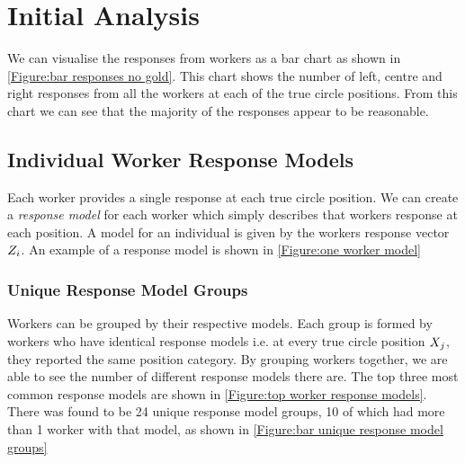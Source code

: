 \section{Initial Analysis}

We can visualise the responses from workers as a bar chart as shown in \ref{Figure:bar responses no gold}. This chart shows the number of left, centre and right responses from all the workers at each of the true circle positions. From this chart we can see that the majority of the responses appear to be reasonable.






\subsection{Individual Worker Response Models}

Each worker provides a single response at each true circle position. We can create a \textit{ response model} for each worker which simply describes that workers response at each position. A model for an individual is given by the workers response vector $Z_i$. An example of a response model is shown in \ref{Figure:one worker model}


\subsubsection{Unique Response Model Groups}
Workers can be grouped by their respective models. Each group is formed by workers who have identical response models i.e. at every true circle position $X_j$, they reported the same position category. By grouping workers together, we are able to see the number of different response models there are. The top three most common response models are shown in \ref{Figure:top worker response models}. There was found to be 24 unique response model groups, 10 of which had more than 1 worker with that model, as shown in \ref{Figure:bar unique response model groups}

